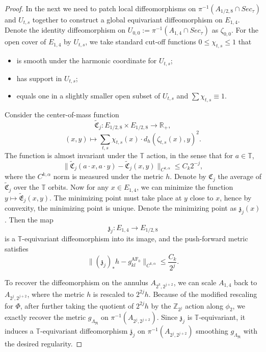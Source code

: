 \documentclass[a4paper,11pt]{amsart}
\theoremstyle{definition}
\numberwithin{equation}{section}
\newcommand{\mR} {\mathfrak R}
\DeclareMathOperator{\AF}{AF}
\begin{document}
\begin{proof}
    In the next we need to patch local diffeomorphisms on $\pi^{-1}(A_{1/2,8}\cap Sec_\tau)$ and $U_{t,s}$ together to construct a global equivariant diffeomorphism on $E_{1,4}$. Denote the identity diffeomorphism on $U_{0,0}:=\pi^{-1}(A_{1,4}\cap Sec_\tau)$ as $\zeta_{0,0}$. For the open cover of $E_{1,4}$ by $U_{t,s}$, we take standard cut-off functions $0\leq \chi_{t,s}\leq1$ that
    \begin{itemize}
        \item is smooth under the harmonic coordinate for $U_{t,s}$;
        \item has support in $U_{t,s}$; 
        \item equals one in a slightly smaller open subset of $U_{t,s}$ and $\sum\chi_{t,s}\equiv1$.
    \end{itemize}
    Consider the center-of-mass function
    $$\widetilde{\mathfrak{C}}_j:E_{1/2,8}\times E_{1/2,8}\to\mathbb{R}_+,$$
    $$(x,y)\mapsto \sum_{t,s}\chi_{t,s}(x)\cdot d_{h}(\zeta_{t,s}(x),y)^2.$$
    The function is almost invariant under the $\mathbb{T}$ action, in the sense that for $a\in \mathbb{T}$, $$\|\widetilde{\mathfrak{C}}_j(a\cdot x,a\cdot y)-\widetilde{\mathfrak{C}}_j(x,y)\|_{C^{k,\alpha}}\leq C_k2^{-j},$$ where the $C^{k,\alpha}$ norm is measured under the metric $h$. Denote by $\mathfrak{C}_j$ the average of  $\widetilde{\mathfrak{C}}_j$ over the $\mathbb T$ orbits.
    Now for any $x\in E_{1,4}$, we can minimize the function $y\mapsto \widetilde{\mathfrak{E}}_j(x,y)$. The minimizing point must take place at $y$  close to $x$, hence by convexity, the minimizing point is unique. Denote the minimizing point as $\mathfrak{z}_j(x)$. Then the map 
    $$\mathfrak{z}_j:E_{1,4}\to E_{1/2,8}$$
    is a $\mathbb{T}$-equivariant diffeomorphism into its image, and the push-forward metric satisfies
    $$\|(\mathfrak{z}_j)_*h-g^{\AF_0}_{kl}\|_{C^{k,\alpha}}\leq\frac{C_k}{2^j}.$$



    To recover the diffeomorphism on the annulus $A_{2^k,2^{j+2}}$, we can scale $A_{1,4}$ back to $A_{2^j,2^{j+2}}$, where the metric $h$ is rescaled to $2^{2j}h$. Because of the modified rescaling for $\Phi$, after further taking the quotient of $2^{2j}h$ by the $\mathbb{Z}_{2^j}$ action along $\phi_2$, we exactly recover the metric $g_{\Lambda_{\mR}}$ on $\pi^{-1}(A_{2^j,2^{j+2}})$. Since $\mathfrak{z}_j$ is $\mathbb{T}$-equivariant, it induces a $\mathbb{T}$-equivariant diffeomorphism $\overline{\mathfrak{z}}_j$ on $\pi^{-1}(A_{2^j,2^{j+2}})$ smoothing $g_{\Lambda_{\mR}}$ with the desired regularity.





\end{proof}
\end{document}
